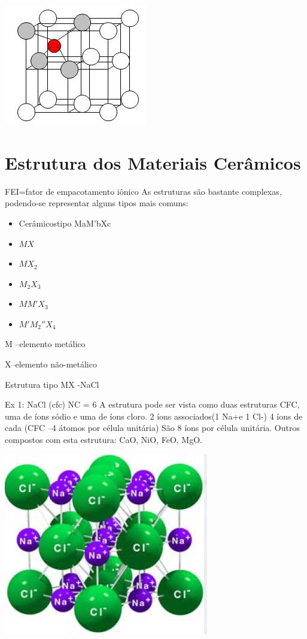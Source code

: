  \includegraphics[scale=0.5,trim={0 0 0 0}]{figures/tetcfc}
 
\section{Estrutura dos Materiais Cerâmicos}
FEI=fator de empacotamento iônico
As estruturas são bastante complexas, podendo-se representar alguns tipos mais comuns:


\begin{itemize}
	\item Cerâmicostipo MaM’bXc
	\item $MX$
	\item $MX_{2}$
	\item $M_{2}X_{3}$
	\item $MM'X_{3}$
	\item $M'M_{2}''X_{4}$
\end{itemize}

M –elemento metálico

X–elemento não-metálico



Estrutura tipo MX -NaCl

Ex 1: NaCl (cfc)
NC = 6
A estrutura pode ser vista como duas estruturas CFC, uma de íons sódio e uma de íons cloro.
2 íons associados(1 Na+e 1 Cl-)
4 íons de cada (CFC –4 átomos por célula unitária)
São 8 íons por célula unitária.
Outros compostos com esta estrutura: CaO, NiO, FeO, MgO.

 \includegraphics[scale=0.5,trim={0 0 0 0}]{figures/NaCl}


